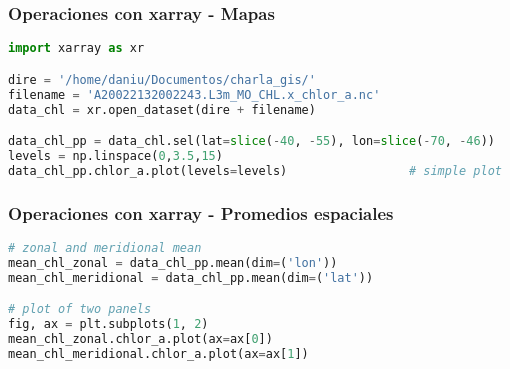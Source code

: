 \documentclass{beamer}
\begin{document}
\begin{frame}[t,fragile]
\frametitle{Operaciones con xarray - Mapas}

\begin{lstlisting}[language=python, basicstyle=\scriptsize]
import xarray as xr

dire = '/home/daniu/Documentos/charla_gis/'
filename = 'A20022132002243.L3m_MO_CHL.x_chlor_a.nc'
data_chl = xr.open_dataset(dire + filename)

data_chl_pp = data_chl.sel(lat=slice(-40, -55), lon=slice(-70, -46))	# select an area
levels = np.linspace(0,3.5,15)
data_chl_pp.chlor_a.plot(levels=levels)					# simple plot
\end{lstlisting}

\begin{figure}
	
	
\end{figure}

\end{frame}

\begin{frame}[t, fragile]
\frametitle{Operaciones con xarray - Promedios espaciales}

\begin{lstlisting}[language=python, basicstyle=\scriptsize]
# zonal and meridional mean
mean_chl_zonal = data_chl_pp.mean(dim=('lon'))
mean_chl_meridional = data_chl_pp.mean(dim=('lat'))

# plot of two panels
fig, ax = plt.subplots(1, 2)
mean_chl_zonal.chlor_a.plot(ax=ax[0])
mean_chl_meridional.chlor_a.plot(ax=ax[1])
\end{lstlisting}

\begin{figure}
	
	
\end{figure}


\end{frame}
\end{document}
